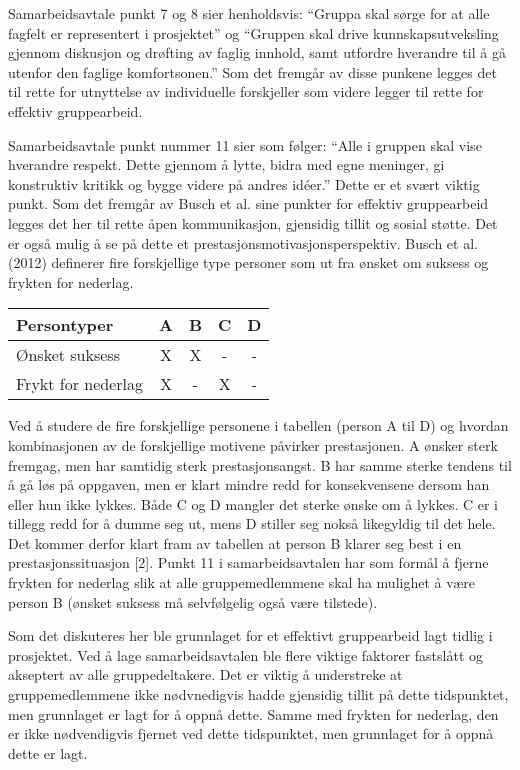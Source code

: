 Samarbeidsavtale punkt 7 og 8 sier henholdsvis: “Gruppa skal sørge for at alle fagfelt er representert i prosjektet” og “Gruppen skal drive kunnskapsutveksling gjennom diskusjon og drøfting av faglig innhold, samt utfordre hverandre til å gå utenfor den faglige komfortsonen.” Som det fremgår av disse punkene legges det til rette for utnyttelse av individuelle forskjeller som videre legger til rette for effektiv gruppearbeid.

Samarbeidsavtale punkt nummer 11 sier som følger: “Alle i gruppen skal vise hverandre respekt. Dette gjennom å lytte, bidra med egne meninger, gi konstruktiv kritikk og bygge videre på andres idéer.” Dette er et svært viktig punkt. Som det fremgår av Busch et al. sine punkter for effektiv gruppearbeid legges det her til rette åpen kommunikasjon, gjensidig tillit og sosial støtte. Det er også mulig å se på dette et prestasjonsmotivasjonsperspektiv. Busch et al. (2012) definerer fire forskjellige type personer som ut fra ønsket om suksess og frykten for nederlag.

\begin{center}
	\begin{tabular}{|l|c|c|c|c|}
		\hline
		Persontyper & A & B & C & D \\ \hline
		Ønsket suksess & X & X & - & - \\ \hline
		Frykt for nederlag & X & - & X & - \\ \hline
	\end{tabular}
\end{center}

Ved å studere de fire forskjellige personene i tabellen (person A til D) og hvordan kombinasjonen av de forskjellige motivene påvirker prestasjonen. A ønsker sterk fremgag, men har samtidig sterk prestasjonsangst. B har samme sterke tendens til å gå løs på oppgaven, men er klart mindre redd for konsekvensene dersom han eller hun ikke lykkes. Både C og D mangler det sterke ønske om å lykkes. C er i tillegg redd for å dumme seg ut, mens D stiller seg nokså likegyldig til det hele. Det kommer derfor klart fram av tabellen at person B klarer seg best i en prestasjonssituasjon [2]. Punkt 11 i samarbeidsavtalen har som formål å fjerne frykten for nederlag slik at alle gruppemedlemmene skal ha mulighet å være person B (ønsket suksess må selvfølgelig også være tilstede).

Som det diskuteres her ble grunnlaget for et effektivt gruppearbeid lagt tidlig i prosjektet. Ved å lage samarbeidsavtalen ble flere viktige faktorer fastslått og akseptert av alle gruppedeltakere. Det er viktig å understreke at gruppemedlemmene ikke nødvnedigvis hadde gjensidig tillit på dette tidspunktet, men grunnlaget er lagt for å oppnå dette. Samme med frykten for nederlag, den er ikke nødvendigvis fjernet ved dette tidspunktet, men grunnlaget for å oppnå dette er lagt.
